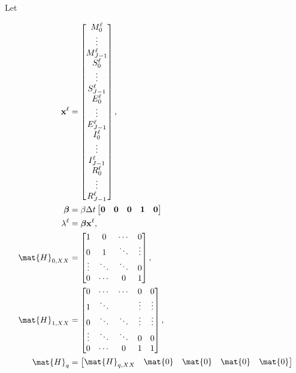 \documentclass{jpmarticle}
\renewcommand{\vec}[1]{\boldsymbol{\mathrm{#1}}}
\let\subequationsorig\subequations%
\let\endsubequationsorig\endsubequations%
\renewenvironment{subequations}{
  \subequationsorig
  \renewcommand{\theequation}{\theparentequation.\arabic{equation}}
}{
  \endsubequationsorig
}
\begin{document}
Let
\begin{subequations}
  \begin{align}
    \vec{x}^{\ell} &=
    \begin{bmatrix}
      M_0^{\ell} \\ \vdots \\ M_{J - 1}^{\ell} \\
      S_0^{\ell} \\ \vdots \\ S_{J - 1}^{\ell} \\
      E_0^{\ell} \\ \vdots \\ E_{J - 1}^{\ell} \\
      I_0^{\ell} \\ \vdots \\ I_{J - 1}^{\ell} \\
      R_0^{\ell} \\ \vdots \\ R_{J - 1}^{\ell}
    \end{bmatrix},
    \\
    \vec{\beta} &=
    \beta \Delta t
    \begin{bmatrix}
      \vec{0} & \vec{0} & \vec{0} & \vec{1} & \vec{0}
    \end{bmatrix}
    \\
    \lambda^{\ell} &=
    \vec{\beta} \vec{x}^{\ell},
    \\
    \mat{H}_{0, XX} &=
    \begin{bmatrix}
      1 & 0 & \cdots & 0 \\
      0 & 1 & \ddots & \vdots \\
      \vdots & \ddots & \ddots & 0 \\
      0 & \cdots & 0 & 1
    \end{bmatrix},
    \\
    \mat{H}_{1, XX} &=
    \begin{bmatrix}
      0 & \cdots & \cdots & 0 & 0 \\
      1 & \ddots & & \vdots & \vdots \\
      0 & \ddots & \ddots & \vdots & \vdots \\
      \vdots & \ddots & \ddots & 0 & 0 \\
      0 & \cdots & 0 & 1 & 1
    \end{bmatrix},
    \\
    \mat{H}_{q} &=
    \begin{bmatrix}
      \mat{H}_{q, XX} & \mat{0} & \mat{0} & \mat{0} & \mat{0} \\

\end{bmatrix}
\end{align}
\end{subequations}
\end{document}
